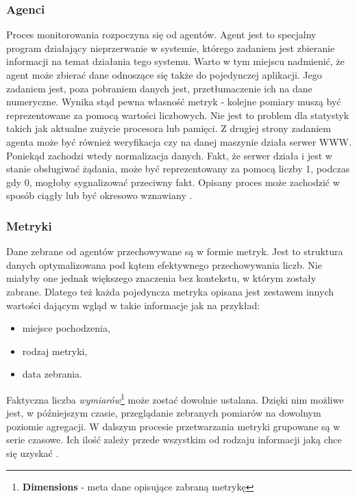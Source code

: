         \subsubsection{Agenci}
        Proces monitorowania rozpoczyna się od agentów. Agent jest to specjalny program działający nieprzerwanie w systemie, którego
        zadaniem jest zbieranie informacji na temat działania tego systemu. Warto w tym miejscu nadmienić, że agent może 
        zbierać dane odnoszące się także do pojedynczej aplikacji. Jego zadaniem jest, poza pobraniem danych jest, 
        przetłumaczenie ich na dane numeryczne. Wynika stąd pewna własność metryk - kolejne pomiary muszą być reprezentowane 
        za pomocą wartości liczbowych.
        Nie jest to problem dla statystyk takich jak aktualne zużycie procesora lub pamięci. Z drugiej strony zadaniem agenta
        może być również weryfikacja czy na danej maszynie działa serwer WWW. Poniekąd zachodzi wtedy normalizacja danych. 
        Fakt, że serwer działa i jest w stanie obsługiwać żądania, może być reprezentowany za pomocą liczby 1, podczas gdy 0, 
        mogłoby sygnalizować przeciwny fakt. Opisany proces może zachodzić w sposób ciągły lub być okresowo wznawiany \cite{monitoring_and_alerting}.
        
        \subsubsection{Metryki}
        Dane zebrane od agentów przechowywane są w formie metryk. Jest to struktura danych optymalizowana pod kątem
        efektywnego przechowywania liczb. Nie miałyby one jednak większego znaczenia bez kontekstu, w którym zostały
        zabrane. Dlatego też każda pojedyncza metryka opisana jest zestawem innych wartości dającym wgląd w takie
        informacje jak na przykład:
        \begin{itemize}
            \item miejsce pochodzenia,
            \item rodzaj metryki,
            \item data zebrania.
        \end{itemize}
        Faktyczna liczba \textit{wymiarów}\footnote{\textbf{Dimensions} - meta dane opisujące zabraną metrykę} może
        zostać dowolnie ustalana. Dzięki nim możliwe jest, w późniejszym czasie, przeglądanie zebranych pomiarów
        na dowolnym poziomie agregacji. W dalszym procesie przetwarzania metryki grupowane są w serie czasowe. Ich ilość
        zależy przede wszystkim od rodzaju informacji jaką chce się uzyskać \cite{monitoring_and_alerting}.
        
